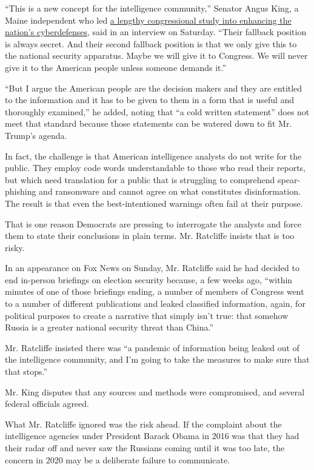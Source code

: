 ``This is a new concept for the intelligence community,'' Senator Angus
King, a Maine independent who led
\href{https://www.nytimes3xbfgragh.onion/2020/03/11/us/politics/congress-cyber-solarium.html?searchResultPosition=1}{a
lengthy congressional study into enhancing the nation's cyberdefenses},
said in an interview on Saturday. ``Their fallback position is always
secret. And their second fallback position is that we only give this to
the national security apparatus. Maybe we will give it to Congress. We
will never give it to the American people unless someone demands it.''

``But I argue the American people are the decision makers and they are
entitled to the information and it has to be given to them in a form
that is useful and thoroughly examined,'' he added, noting that ``a cold
written statement'' does not meet that standard because those statements
can be watered down to fit Mr. Trump's agenda.

In fact, the challenge is that American intelligence analysts do not
write for the public. They employ code words understandable to those who
read their reports, but which need translation for a public that is
struggling to comprehend spear-phishing and ransomware and cannot agree
on what constitutes disinformation. The result is that even the
best-intentioned warnings often fail at their purpose.

That is one reason Democrats are pressing to interrogate the analysts
and force them to state their conclusions in plain terms. Mr. Ratcliffe
insists that is too risky.

In an appearance on Fox News on Sunday, Mr. Ratcliffe said he had
decided to end in-person briefings on election security because, a few
weeks ago, ``within minutes of one of those briefings ending, a number
of members of Congress went to a number of different publications and
leaked classified information, again, for political purposes to create a
narrative that simply isn't true: that somehow Russia is a greater
national security threat than China.''

Mr. Ratcliffe insisted there was ``a pandemic of information being
leaked out of the intelligence community, and I'm going to take the
measures to make sure that that stops.''

Mr. King disputes that any sources and methods were compromised, and
several federal officials agreed.

What Mr. Ratcliffe ignored was the risk ahead. If the complaint about
the intelligence agencies under President Barack Obama in 2016 was that
they had their radar off and never saw the Russians coming until it was
too late, the concern in 2020 may be a deliberate failure to
communicate.

